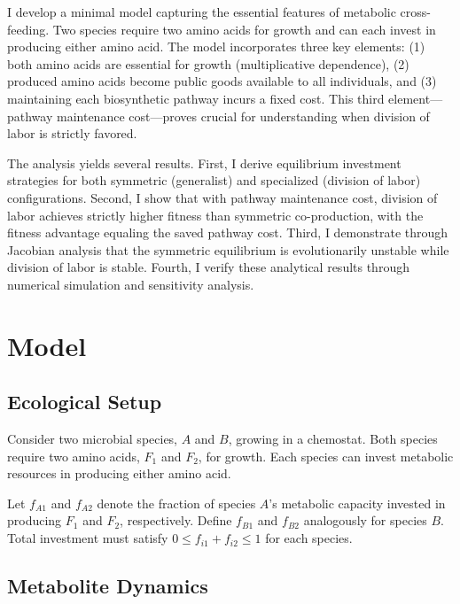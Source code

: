 \documentclass[11pt]{article}
\theoremstyle{definition}
\begin{document}
I develop a minimal model capturing the essential features of metabolic cross-feeding. Two species require two amino acids for growth and can each invest in producing either amino acid. The model incorporates three key elements: (1) both amino acids are essential for growth (multiplicative dependence), (2) produced amino acids become public goods available to all individuals, and (3) maintaining each biosynthetic pathway incurs a fixed cost. This third element---pathway maintenance cost---proves crucial for understanding when division of labor is strictly favored.

The analysis yields several results. First, I derive equilibrium investment strategies for both symmetric (generalist) and specialized (division of labor) configurations. Second, I show that with pathway maintenance cost, division of labor achieves strictly higher fitness than symmetric co-production, with the fitness advantage equaling the saved pathway cost. Third, I demonstrate through Jacobian analysis that the symmetric equilibrium is evolutionarily unstable while division of labor is stable. Fourth, I verify these analytical results through numerical simulation and sensitivity analysis.

\section{Model}

\subsection{Ecological Setup}

Consider two microbial species, $A$ and $B$, growing in a chemostat. Both species require two amino acids, $F_1$ and $F_2$, for growth. Each species can invest metabolic resources in producing either amino acid.

Let $f_{A1}$ and $f_{A2}$ denote the fraction of species $A$'s metabolic capacity invested in producing $F_1$ and $F_2$, respectively. Define $f_{B1}$ and $f_{B2}$ analogously for species $B$. Total investment must satisfy $0 \leq f_{i1} + f_{i2} \leq 1$ for each species.

\subsection{Metabolite Dynamics}
\end{document}
